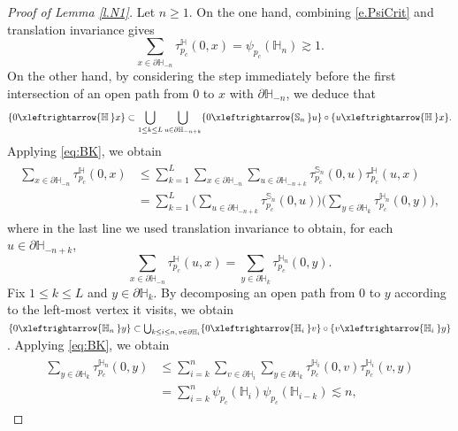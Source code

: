 \documentclass[11pt,a4paper]{article}
\numberwithin{equation}{section}
\theoremstyle{plain}
\theoremstyle{definition}
\newcommand{\connect}{\xleftrightarrow}
\newcommand{\1}{\mathbf 1}
\def\H{\mathbb{H}}
\begin{document}
\begin{proof}[Proof of Lemma \textup{\ref{l.N1}}] Let $n\geq 1$. On the one hand, combining \eqref{e.PsiCrit} and translation invariance gives 
	\begin{equation}\label{eq:H_lowerbound}
	 \sum_{x\in \partial \H_{-n}} \tau_{p_c}^{\H}(0,x) = \psi_{p_c}(\H_n) \gtrsim 1.
	\end{equation}
	On the other hand, by considering the step immediately before the first intersection of an open path from $0$ to $x$ with $\partial\H_{-n}$, we deduce that 
	\begin{equation}
	\{0\connect{\H\:}x\}\subset \bigcup_{1\leq k\leq L} \bigcup_{u\in \partial \H_{-n+k}} \{0\connect{\mathbb{S}_n\:}u\} \circ \{u\connect{\H\:}x\}.
	\end{equation}
	 Applying \eqref{eq:BK}, we obtain
	\begin{align}
		\begin{split}\label{eq:H-to-S}
			\sum_{x\in \partial \H_{-n}} \tau_{p_c}^{\H}(0,x) &\leq \sum_{k=1}^L \sum_{x\in \partial \H_{-n}}  \sum_{u\in \partial \H_{-n+k}} \tau_{p_c}^{\mathbb{S}_n}(0,u)\tau_{p_c}^{\H}(u,x) \\
			&= \sum_{k=1}^L \Bigg( \sum_{u\in \partial \H_{-n+k}} \tau_{p_c}^{\mathbb{S}_n}(0,u) \Bigg) \Bigg( \sum_{y\in\partial\H_{k}} \tau_{p_c}^{\H_{n}}(0,y) \Bigg),
		\end{split}
	\end{align}
	where in the last line we used translation invariance to obtain, for each $u\in \partial \mathbb H_{-n+k}$,
	\begin{equation}
		\sum_{x\in \partial \H_{-n}}\tau^{\mathbb H}_{p_c}(u,x)=\sum_{y\in\partial\H_{k}} \tau_{p_c}^{\H_{n}}(0,y).
	\end{equation} 
	Fix $1\leq k\leq L$ and $y\in \partial \H_k$. By decomposing an open path from $0$ to $y$ according to the left-most vertex it visits, we obtain $\{0\connect{\H_n\:}y\}\subset \bigcup_{k\leq i\leq n,\, v\in \partial\H_i} \{0\connect{\H_i\:}v\} \circ \{v\connect{\H_i\:}y\}$. Applying \eqref{eq:BK}, we obtain
	\begin{align}
		\begin{split}\label{eq:H_upperbound}
			\sum_{y\in\partial\H_{k}} \tau_{p_c}^{\H_n}(0,y) &\leq \sum_{i=k}^{n} \sum_{v\in \partial \H_i} \sum_{y\in\partial\H_{k}}  \tau_{p_c}^{\H_i}(0,v) \tau_{p_c}^{\H_i}(v,y) \\
			&= \sum_{i=k}^{n} \psi_{p_c}(\H_i)\psi_{p_c}(\H_{i-k}) \lesssim n,
		\end{split}
	\end{align}

\end{proof}
\end{document}
